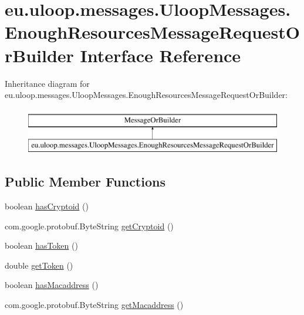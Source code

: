 \hypertarget{interfaceeu_1_1uloop_1_1messages_1_1UloopMessages_1_1EnoughResourcesMessageRequestOrBuilder}{\section{eu.\+uloop.\+messages.\+Uloop\+Messages.\+Enough\+Resources\+Message\+Request\+Or\+Builder Interface Reference}
\label{interfaceeu_1_1uloop_1_1messages_1_1UloopMessages_1_1EnoughResourcesMessageRequestOrBuilder}
}
Inheritance diagram for eu.\+uloop.\+messages.\+Uloop\+Messages.\+Enough\+Resources\+Message\+Request\+Or\+Builder\+:\begin{figure}[H]
\begin{center}
\leavevmode
\includegraphics[height=2.000000cm]{interfaceeu_1_1uloop_1_1messages_1_1UloopMessages_1_1EnoughResourcesMessageRequestOrBuilder}
\end{center}
\end{figure}
\subsection*{Public Member Functions}
\begin{DoxyCompactItemize}
\item 
boolean \hyperlink{interfaceeu_1_1uloop_1_1messages_1_1UloopMessages_1_1EnoughResourcesMessageRequestOrBuilder_acb6b122d250a9d33b1719cf09c503a92}{has\+Cryptoid} ()
\item 
com.\+google.\+protobuf.\+Byte\+String \hyperlink{interfaceeu_1_1uloop_1_1messages_1_1UloopMessages_1_1EnoughResourcesMessageRequestOrBuilder_a4dab493ebc532d67379d4effa1571948}{get\+Cryptoid} ()
\item 
boolean \hyperlink{interfaceeu_1_1uloop_1_1messages_1_1UloopMessages_1_1EnoughResourcesMessageRequestOrBuilder_ad6a44338faeecfb2e0d8136ceb58d133}{has\+Token} ()
\item 
double \hyperlink{interfaceeu_1_1uloop_1_1messages_1_1UloopMessages_1_1EnoughResourcesMessageRequestOrBuilder_a79f2612a20e1d83e8e1ae0702435e2a0}{get\+Token} ()
\item 
boolean \hyperlink{interfaceeu_1_1uloop_1_1messages_1_1UloopMessages_1_1EnoughResourcesMessageRequestOrBuilder_affc52875e965cf2529453ff79f8f9a69}{has\+Macaddress} ()
\item 
com.\+google.\+protobuf.\+Byte\+String \hyperlink{interfaceeu_1_1uloop_1_1messages_1_1UloopMessages_1_1EnoughResourcesMessageRequestOrBuilder_aa25de85e180eb723b9ec337c841f64f9}{get\+Macaddress} ()
\end{DoxyCompactItemize}



